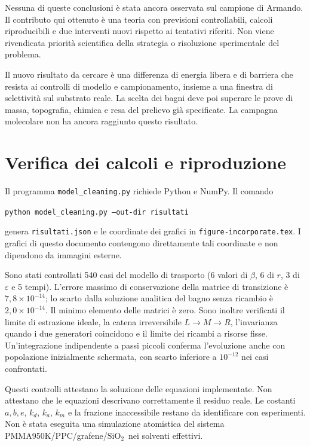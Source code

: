 \documentclass[11pt,reqno]{amsart}
\numberwithin{equation}{section}
\newcommand{\SiO}{\ensuremath{\mathrm{SiO}_2}}
\begin{document}
Nessuna di queste conclusioni \`e stata ancora osservata sul
campione di Armando. Il contributo qui ottenuto \`e una teoria
con previsioni controllabili, calcoli riproducibili e due
interventi nuovi rispetto ai tentativi riferiti. Non viene
rivendicata priorit\`a scientifica della strategia o risoluzione
sperimentale del problema.

Il nuovo risultato da cercare \`e una differenza di energia libera
e di barriera che resista ai controlli di modello e campionamento,
insieme a una finestra di selettivit\`a sul substrato reale. La scelta
dei bagni deve poi superare le prove di massa, topografia, chimica
e resa del prelievo gi\`a specificate. La campagna molecolare non
ha ancora raggiunto questo risultato.

\appendix
\section{Verifica dei calcoli e riproduzione}

Il programma \texttt{model\_cleaning.py} richiede Python e NumPy.
Il comando
\begin{center}
\texttt{python model\_cleaning.py --out-dir risultati}
\end{center}
genera \texttt{risultati.json} e le coordinate dei grafici
in \texttt{figure-incorporate.tex}. I grafici di questo
documento contengono direttamente tali coordinate e non
dipendono da immagini esterne.

Sono stati controllati 540 casi del modello di trasporto
(6 valori di $\beta$, 6 di $r$, 3 di $\varepsilon$ e 5 tempi).
L'errore massimo di conservazione della matrice di transizione
\`e $7{,}8\times10^{-14}$; lo scarto dalla soluzione analitica
del bagno senza ricambio \`e $2{,}0\times10^{-14}$.
Il minimo elemento delle matrici \`e zero. Sono inoltre
verificati il limite di estrazione ideale, la catena
irreversibile $L\to M\to R$, l'invarianza quando i due
generatori coincidono e il limite dei ricambi a risorse fisse.
Un'integrazione indipendente a passi piccoli conferma
l'evoluzione anche con popolazione inizialmente schermata,
con scarto inferiore a $10^{-12}$ nei casi confrontati.

Questi controlli attestano la soluzione delle equazioni
implementate. Non attestano che le equazioni descrivano
correttamente il residuo reale. Le costanti $a,b,e$, $k_d$,
$k_a$, $k_m$ e la frazione inaccessibile restano da identificare
con esperimenti. Non \`e stata eseguita una simulazione
atomistica del sistema PMMA950K/PPC/grafene/\SiO\ nei
solventi effettivi.
\end{document}
